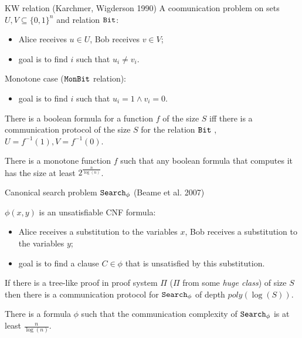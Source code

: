 \begin{frame}{KW relation (Karchmer, Wigderson 1990)}
    A coomunication problem on sets $U, V \subseteq \{0, 1\}^{n}$ and relation $\mathtt{Bit}$:
    \begin{itemize}
        \item Alice receives $u \in U$, Bob receives $v \in V$;
        \item goal is to find $i$ such that $u_i \neq v_i$.
    \end{itemize}
    \pause
    Monotone case ($\mathtt{MonBit}$ relation):
    \begin{itemize}
        \item goal is to find $i$ such that $u_i = 1 \land v_i = 0$.
    \end{itemize}

    \pause

    \begin{theorem}
        There is a  boolean {\color{blue} formula} for a function $f$ of the
        size $S$ iff there is a communication protocol of the size $S$ for the relation $\mathtt{Bit}$
        , $U = f^{-1}(1), V = f^{-1}(0)$.
    \end{theorem}

    \pause
    \pause
    
    \begin{theorem}[Pitassi, G{\"{o}}{\"{o}}s, 2014]
        There is a monotone function $f$ such that any boolean formula that computes it has the size at least
        $2^{\frac{n}{\log(n)}}$. 
    \end{theorem}
\end{frame}

\begin{frame}{Canonical search problem $\mathtt{Search}_{\phi}$ (Beame et al. 2007)}
    
    $\phi(x, y)$ is an unsatisfiable CNF formula:
    \begin{itemize}
        \item Alice receives a substitution to the variables $x$, Bob receives a substitution to the variables $y$;
        \item goal is to find a clause $C \in \phi$ that is unsatisfied by this substitution.
    \end{itemize}

    \pause

    \begin{theorem}
        If there is a {\color{blue} tree-like} proof in proof system $\Pi$ ($\Pi$ from some \textit{huge
          class}) of size $S$ then there is a communication protocol for $\mathtt{Search}_{\phi}$ of depth
        $poly(\log(S))$.
    \end{theorem}

    \pause
    
    \begin{theorem}[Pitassi, G{\"{o}}{\"{o}}s, 2014]
        There is a formula $\phi$ such that the communication complexity of $\mathtt{Search}_{\phi}$ is at least $\frac{n}{\log(n)}$.
    \end{theorem}
\end{frame}

